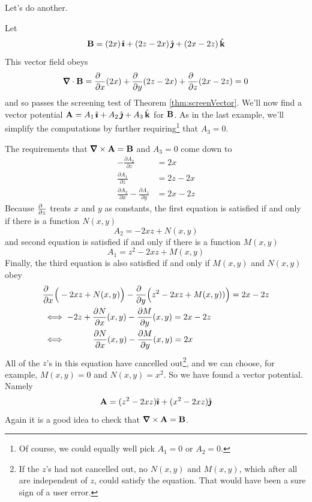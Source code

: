 \noindent Let's do another.
\begin{eg}\label{eg:vectorPotentialB}
Let 
\begin{equation*}
\mathbf{B} = (2x)\,\hat{\pmb{\imath}}+(2z-2x)\,\hat{\pmb{\jmath}} +(2x-2z)\,\hat{\mathbf{k}}
\end{equation*}
This vector field obeys
\begin{equation*}
\vnabla\cdot\vB = \frac{\partial\hfill}{\partial x}(2x)
                 +\frac{\partial\hfill}{\partial y}(2z-2x)
                 +\frac{\partial\hfill}{\partial z}(2x-2z)
                =0
\end{equation*}
and so passes the screening test of Theorem \ref{thm:screenVector}.
We'll now find a vector potential $\mathbf{A}= A_1\,\hat{\pmb{\imath}} + A_2\,\hat{\pmb{\jmath}} + A_3\,\hat{\mathbf{k}}$ 
for $\mathbf{B}$. As in the last example, we'll simplify the computations
by further requiring\footnote{Of course, we could equally well pick
$A_1=0$ or $A_2=0$.} that $A_3=0$. 

The requirements that $\vnabla\times\vA = \vB$ and $A_3=0$ come down to
 \begin{align*}
 -\frac{\partial A_2}{\partial z} &=2x\\
  \frac{\partial A_1}{\partial z} &=2z-2x \\
\frac{\partial A_2}{\partial x} -\frac{\partial A_1}{\partial y}&=2x-2z
\end{align*}
Because $\frac{\partial\hfill}{\partial z}$ treats $x$ and $y$
as constants, the first equation is satisfied if and only if there 
is a function $N(x,y)$
\begin{equation*}
A_2 = -2xz + N(x,y)
\end{equation*}
and second equation is satisfied if and only if there 
is a function $M(x,y)$
\begin{equation*}
A_1 = z^2-2xz + M(x,y)
\end{equation*}
Finally, the third equation is also satisfied
if and only if $M(x,y)$ and $N(x,y)$ obey
\begin{align*}
&\frac{\partial\hfill}{\partial x}\Big(-2xz + N(x,y)\Big) 
-\frac{\partial\hfill}{\partial y}\Big(z^2-2xz + M(x,y))\Big)=2x-2z \\
&\iff
-2z+\frac{\partial N}{\partial x}(x,y) -\frac{\partial M}{\partial y}(x,y) 
 =2x -2z \\
&\iff
\phantom{-2z+\ \,}
\frac{\partial N}{\partial x}(x,y) -\frac{\partial M}{\partial y}(x,y) 
 =2x
\end{align*}
All of the $z$'s in this equation have cancelled out\footnote{If the $z$'s had not cancelled out, no $N(x,y)$ and $M(x,y)$, which after all are 
independent of $z$, 
could satisfy the equation. That would have been a sure sign of a 
user error.}, and we can choose, for example,
$M(x,y)=0$ and  $N(x,y) = x^2$. So we have found a vector potential. Namely
\begin{equation*}
\mathbf{A} = (z^2-2xz) \hat{\pmb{\imath}} +(x^2-2xz)\hat{\pmb{\jmath}}
\end{equation*}
Again it is a good idea to check that $\vnabla\times\vA=\vB$.
\end{eg}

